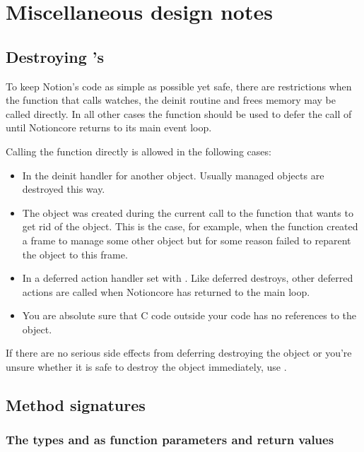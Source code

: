 \section{Miscellaneous design notes}

\subsection{Destroying 's}

To keep Notion's code as simple as possible yet safe, there are restrictions
when the 
function that calls watches, the deinit routine and frees memory may
be called directly. In all other cases the %
function should be used to defer the call of  until
Notioncore returns to its main event loop. 

Calling the  function directly is allowed in the
following cases:
\begin{itemize}
    \item In the deinit handler for another object. Usually managed objects
      are destroyed this way.
    \item The object was created during the current call to the function
      that wants to get rid of the object. This is the case, for example,
      when the function created a frame to manage some other object but for
      some reason failed to reparent the object to this frame.
    \item In a deferred action handler set with %
      .
      Like deferred destroys, other deferred actions are called when
      Notioncore has returned to the main loop.
    \item You are absolute sure that C code outside your code has no
      references to the object.
\end{itemize}

If there are no serious side effects from deferring destroying the
object or you're unsure whether it is safe to destroy the object
immediately, use .

\subsection{Method signatures}

\subsubsection{The types  and  as function
  parameters and return values}

